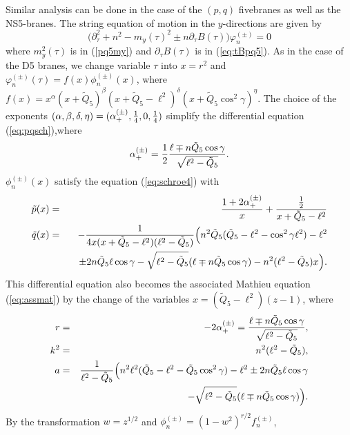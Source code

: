 \documentclass[a4paper,12pt]{article}
\begin{document}
Similar analysis can be done in the case of the 
$(p,q)$ fivebranes as well as the NS5-branes.
The string equation of motion in the $y$-directions are given by
\begin{equation}
\Big( \partial^2_\tau +n^2 -m_{y}(\tau)^2
\pm n \partial_\tau B(\tau) \Big) \varphi^{(\pm)}_{n}=0
\label{eq:pqsch}
\end{equation}
where $m_{y}^2(\tau)$ is in (\ref{pq5my}) and $\partial_{\tau} B(\tau)$ is in
(\ref{eq:tBpq5}).
As in the case of the D5 branes, we change variable $\tau$ into 
$x=r^2$
and $\varphi^{(\pm)}_{n}(\tau)=f(x)\phi^{(\pm)}_{n}(x)$, where
$f(x)=x^{\alpha}(x+\tilde{Q}_{5})^{\beta}(x+\tilde{Q}_{5}-\ell^2)^{\delta}
(x+\tilde{Q}_{5}\cos^2\gamma)^{\eta}$.
The choice of the exponents $(\alpha,\beta,\delta,\eta)=
(\alpha_{+}^{(\pm)},{1\over4},0,{1\over4})$ 
simplify the differential equation (\ref{eq:pqsch}),where
\begin{equation}
 \alpha_{+}^{(\pm)}={1\over2}{\ell \mp n \tilde{Q}_{5}\cos\gamma\over \sqrt{
\ell^2-\tilde{Q}_{5}}}.
\end{equation}
$\phi^{(\pm)}_{n}(x)$ satisfy the equation (\ref{eq:schroe4}) with
\begin{eqnarray} 
 \tilde{p}(x)&=& {1+2\alpha_{+}^{(\pm)}\over x}
+{{1\over2}\over x+\tilde{Q}_{5}-\ell^2 }\\
\tilde{q}(x)&=&
-{1\over 4x (x+\tilde{Q}_{5}-\ell^2) (\ell^2-\tilde{Q}_{5})}\Big(
n^2\tilde{Q}_{5}(\tilde{Q}_{5}-\ell^2-\cos^2\gamma\ell^2)-\ell^2
\nonumber\\
&&\quad
\pm 2n\tilde{Q}_5\ell\cos\gamma-
\sqrt{\ell^2-\tilde{Q}_{5}}(\ell\mp n\tilde{Q}_5\cos\gamma)
-n^2(\ell^2-\tilde{Q}_{5})x
\Big).
\label{eq:coeff2}
\end{eqnarray}
This differential equation also becomes the associated Mathieu equation
(\ref{eq:assmat})
by the change of the variables $x=(\tilde{Q}_{5}-\ell^2)(z-1)$, 
where
\begin{eqnarray}
 r&=& -2\alpha^{(\pm)}_{+}= 
{\ell \mp n \tilde{Q}_{5}\cos\gamma\over \sqrt{
\ell^2-\tilde{Q}_{5}}},\nonumber\\
k^2&=& n^2(\ell^2-\tilde{Q}_{5}),\nonumber\\
a&=& {1\over \ell^2-\tilde{Q}_{5}}
\Bigl(n^2\ell^2(\tilde{Q}_{5}-\ell^2-\tilde{Q}_{5}\cos^2\gamma)-\ell^2
\pm 2n\tilde{Q}_{5}\ell \cos\gamma
\nonumber\\
&& -\sqrt{\ell^2-\tilde{Q}_{5}}(\ell\mp n\tilde{Q}_{5}\cos\gamma)
\Bigr).
\end{eqnarray}
By the transformation
$w=z^{1/2}$ and $\phi^{(\pm)}_{n}=(1-w^2)^{r/2}f^{(\pm)}_{n}$,
\end{document}
